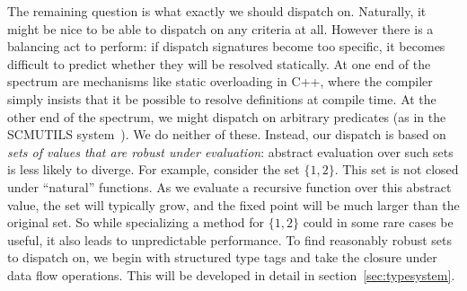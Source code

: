 The remaining question is what exactly we should dispatch on.
Naturally, it might be nice to be able to dispatch on any criteria
at all.
However there is a balancing act to perform: if dispatch signatures
become too specific, it becomes difficult to predict whether they
will be resolved statically.
At one end of the spectrum are mechanisms like static overloading
in C++, where the compiler simply insists that it be possible to
resolve definitions at compile time.
At the other end of the spectrum, we might dispatch on arbitrary
predicates (as in the SCMUTILS system~\cite{Sussman:2001:SIC:375178}).
We do neither of these.
Instead, our dispatch is based on \emph{sets of values that are robust
under evaluation}: abstract evaluation over such sets is less likely
to diverge.
For example, consider the set $\{1,2\}$.
This set is not closed under ``natural'' functions.
As we evaluate a recursive function over this abstract value, the
set will typically grow, and the fixed point will be much larger
than the original set.
So while specializing a method for $\{1,2\}$ could in some rare
cases be useful, it also leads to unpredictable performance.
To find reasonably robust sets to dispatch on, we
begin with structured type tags and take the closure under data flow
operations.
This will be developed in detail in section~\ref{sec:typesystem}.






